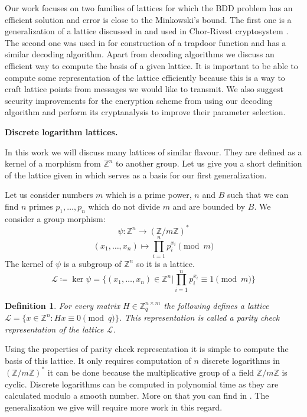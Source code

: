 \documentclass[12pt]{article}
\newcommand{\ZZ}{\mathbb{Z}}
\newcommand{\LL}{\mathcal{L}}
\newtheorem{definition}{Definition}
\begin{document}
Our work focuses on two families of lattices for which the BDD problem has an efficient solution and error is close to the Minkowski's bound. The first one is a generalization of a lattice discussed in \cite{[DP19]} and used in Chor-Rivest cryptosystem \cite{[CR88]}. The second one was used in \cite{[LLXY17]} for construction of a trapdoor function and has a similar decoding algorithm. Apart from decoding algorithms we discuss an efficient way to compute the basis of a given lattice. It is important to be able to compute some representation of the lattice efficiently because this is a way to craft lattice points from messages we would like to transmit. We also suggest security improvements for the encryption scheme from \cite{[LLXY17]} using our decoding algorithm and perform its cryptanalysis to improve their parameter selection.

\textbf{Discrete logarithm lattices.}

In this work we will discuss many lattices of similar flavour. They are defined as a kernel of a morphism from $\ZZ^{n}$ to another group. Let us give you a short definition of the lattice given in \cite{[DP19]} which serves as a basis for our first generalization.

Let us consider numbers $m$ which is a prime power, $n$ and $B$ such that we can find $n$ primes $p_{1}, \dots , p_{n}$ which do not divide $m$ and are bounded by $B$. We consider a group morphism:
\[
    \psi : \ZZ^{n} \rightarrow (\ZZ/m\ZZ)^*
\]
\[
    (x_{1}, \dots, x_{n}) \mapsto \prod_{i=1}^{n}p_{i}^{x_{i}} \pmod{m}
\]
The kernel of $\psi$ is a subgroup of $\ZZ^{n}$ so it is a lattice.
\[
    \LL \coloneqq \ker \psi = \{(x_{1}, \dots, x_{n}) \in \ZZ^{n} | \prod_{i=1}^{n}p_{i}^{x_{i}} \equiv 1 \pmod{m}\}
\]

\begin{definition}
For every matrix $H \in \ZZ_{q}^{n \times m}$ the following defines a lattice $\LL = \{x \in \ZZ^{n}: Hx \equiv 0 \pmod{q}\}$. This representation is called a parity check representation of the lattice $\LL$.
\end{definition}

Using the properties of parity check representation it is simple to compute the basis of this lattice. It only requires computation of $n$ discrete logarithms in $(\ZZ/m\ZZ)^*$ it can be done because the multiplicative group of a field $\ZZ/m\ZZ$ is cyclic. Discrete logarithms can be computed in polynomial time as they are calculated modulo a smooth number. More on that you can find in \cite{[DP19]}. The generalization we give will require more work in this regard.
\end{document}
